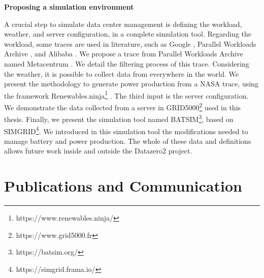 \begin{center}
    \textbf{Proposing a simulation environment}
\end{center}
A crucial step to simulate data center management is defining the workload, weather, and server configuration, in a complete simulation tool. Regarding the workload, some traces are used in literature, such as Google \cite{reiss2011google}, Parallel Workloads Archive \cite{feitelson2014experience}, and Alibaba \cite{wang2022characterizing}. We propose a trace from Parallel Workloads Archive named Metacentrum \cite{klusavcek2017real}. We detail the filtering process of this trace. Considering the weather, it is possible to collect data from everywhere in the world. We present the methodology to generate power production from a NASA trace, using the framework Renewables.ninja\footnote{https://www.renewables.ninja/} \cite{pfenninger2016long}. The third input is the server configuration. We demonstrate the data collected from a server in GRID5000\footnote{https://www.grid5000.fr} used in this thesis. Finally, we present the simulation tool named BATSIM\footnote{https://batsim.org/}, based on SIMGRID\footnote{https://simgrid.frama.io/}. We introduced in this simulation tool the modifications needed to manage battery and power production. The whole of these data and definitions allows future work inside and outside the Datazero2 project.

\section{Publications and Communication}

